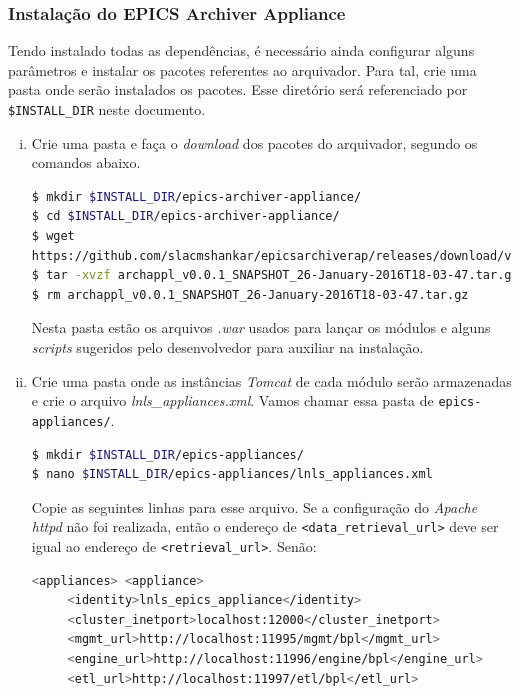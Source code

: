 \subsubsection {Instalação do EPICS Archiver Appliance}
\label{sec:epicsappl}

Tendo instalado todas as dependências, é necessário ainda configurar
alguns parâmetros e instalar os pacotes referentes ao arquivador. Para tal, crie
uma pasta onde serão instalados os pacotes. Esse diretório será referenciado por
\texttt{\$INSTALL\_DIR} neste documento.

\begin {enumerate}[i.] 
  \item Crie uma pasta e faça o \textit{download} dos pacotes do arquivador,
  segundo os comandos abaixo. 
\begin{lstlisting}[language=bash, style=nonumbers]
$ mkdir $INSTALL_DIR/epics-archiver-appliance/
$ cd $INSTALL_DIR/epics-archiver-appliance/
$ wget
https://github.com/slacmshankar/epicsarchiverap/releases/download/v0.0.1_SNAPSHOT_26-January-2016/archappl_v0.0.1_SNAPSHOT_26-January-2016T18-03-47.tar.gz
$ tar -xvzf archappl_v0.0.1_SNAPSHOT_26-January-2016T18-03-47.tar.gz
$ rm archappl_v0.0.1_SNAPSHOT_26-January-2016T18-03-47.tar.gz
\end{lstlisting}
	Nesta pasta estão os arquivos \textit{.war}  usados para lançar os módulos e
	alguns \textit{scripts} sugeridos pelo desenvolvedor para auxiliar na
	instalação.
  \item \label{item:appl} Crie uma pasta onde as instâncias \textit{Tomcat} de cada módulo serão
  armazenadas e crie o arquivo \textit{lnls\_appliances.xml}. Vamos chamar essa
  pasta de \texttt{epics-appliances/}. 
\begin{lstlisting}[language=bash, style=nonumbers]
$ mkdir $INSTALL_DIR/epics-appliances/
$ nano $INSTALL_DIR/epics-appliances/lnls_appliances.xml
\end{lstlisting}
Copie as seguintes linhas para esse arquivo. Se a configuração do
\textit{Apache httpd} não foi realizada, então o endereço de
\texttt{<data\_retrieval\_url>} deve ser igual ao endereço de
\texttt{<retrieval\_url>}. Senão:
\begin{lstlisting}[language=bash, style=nonumbers]
<appliances> <appliance>
     <identity>lnls_epics_appliance</identity>
     <cluster_inetport>localhost:12000</cluster_inetport>
     <mgmt_url>http://localhost:11995/mgmt/bpl</mgmt_url>
     <engine_url>http://localhost:11996/engine/bpl</engine_url>
     <etl_url>http://localhost:11997/etl/bpl</etl_url>

\end{lstlisting}
\end{enumerate}
